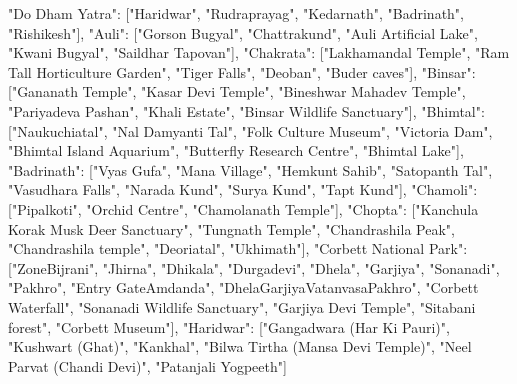 {
  "Do Dham Yatra": ["Haridwar", "Rudraprayag", "Kedarnath", "Badrinath", "Rishikesh"],
  "Auli": ["Gorson Bugyal", "Chattrakund", "Auli Artificial Lake", "Kwani Bugyal", "Saildhar Tapovan"],
  "Chakrata": ["Lakhamandal Temple", "Ram Tall Horticulture Garden", "Tiger Falls", "Deoban", "Buder caves"],
  "Binsar": ["Gananath Temple", "Kasar Devi Temple", "Bineshwar Mahadev Temple", "Pariyadeva Pashan", "Khali Estate", "Binsar Wildlife Sanctuary"],
  "Bhimtal": ["Naukuchiatal", "Nal Damyanti Tal", "Folk Culture Museum", "Victoria Dam", "Bhimtal Island Aquarium", "Butterfly Research Centre", "Bhimtal Lake"],
  "Badrinath": ["Vyas Gufa", "Mana Village", "Hemkunt Sahib", "Satopanth Tal", "Vasudhara Falls", "Narada Kund", "Surya Kund", "Tapt Kund"],
  "Chamoli": ["Pipalkoti", "Orchid Centre", "Chamolanath Temple"],
  "Chopta": ["Kanchula Korak Musk Deer Sanctuary", "Tungnath Temple", "Chandrashila Peak", "Chandrashila temple", "Deoriatal", "Ukhimath"],
  "Corbett National Park": ["ZoneBijrani", "Jhirna", "Dhikala", "Durgadevi", "Dhela", "Garjiya", "Sonanadi", "Pakhro", "Entry GateAmdanda", "DhelaGarjiyaVatanvasaPakhro", "Corbett Waterfall", "Sonanadi Wildlife Sanctuary", "Garjiya Devi Temple", "Sitabani forest", "Corbett Museum"],
  "Haridwar": ["Gangadwara (Har Ki Pauri)", "Kushwart (Ghat)", "Kankhal", "Bilwa Tirtha (Mansa Devi Temple)", "Neel Parvat (Chandi Devi)", "Patanjali Yogpeeth"]
}
